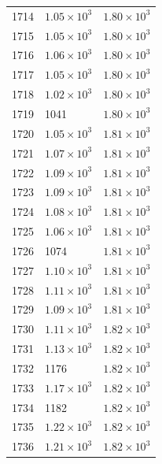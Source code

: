\begin{table}[H]
\begin{tabular}{lll}
1714 & $\displaystyle 1.05 \times 10^{3}$ & $\displaystyle 1.80 \times 10^{3}$ \\
1715 & $\displaystyle 1.05 \times 10^{3}$ & $\displaystyle 1.80 \times 10^{3}$ \\
1716 & $\displaystyle 1.06 \times 10^{3}$ & $\displaystyle 1.80 \times 10^{3}$ \\
1717 & $\displaystyle 1.05 \times 10^{3}$ & $\displaystyle 1.80 \times 10^{3}$ \\
1718 & $\displaystyle 1.02 \times 10^{3}$ & $\displaystyle 1.80 \times 10^{3}$ \\
1719 & 1041 & $\displaystyle 1.80 \times 10^{3}$ \\
1720 & $\displaystyle 1.05 \times 10^{3}$ & $\displaystyle 1.81 \times 10^{3}$ \\
1721 & $\displaystyle 1.07 \times 10^{3}$ & $\displaystyle 1.81 \times 10^{3}$ \\
1722 & $\displaystyle 1.09 \times 10^{3}$ & $\displaystyle 1.81 \times 10^{3}$ \\
1723 & $\displaystyle 1.09 \times 10^{3}$ & $\displaystyle 1.81 \times 10^{3}$ \\
1724 & $\displaystyle 1.08 \times 10^{3}$ & $\displaystyle 1.81 \times 10^{3}$ \\
1725 & $\displaystyle 1.06 \times 10^{3}$ & $\displaystyle 1.81 \times 10^{3}$ \\
1726 & 1074 & $\displaystyle 1.81 \times 10^{3}$ \\
1727 & $\displaystyle 1.10 \times 10^{3}$ & $\displaystyle 1.81 \times 10^{3}$ \\
1728 & $\displaystyle 1.11 \times 10^{3}$ & $\displaystyle 1.81 \times 10^{3}$ \\
1729 & $\displaystyle 1.09 \times 10^{3}$ & $\displaystyle 1.81 \times 10^{3}$ \\
1730 & $\displaystyle 1.11 \times 10^{3}$ & $\displaystyle 1.82 \times 10^{3}$ \\
1731 & $\displaystyle 1.13 \times 10^{3}$ & $\displaystyle 1.82 \times 10^{3}$ \\
1732 & 1176 & $\displaystyle 1.82 \times 10^{3}$ \\
1733 & $\displaystyle 1.17 \times 10^{3}$ & $\displaystyle 1.82 \times 10^{3}$ \\
1734 & 1182 & $\displaystyle 1.82 \times 10^{3}$ \\
1735 & $\displaystyle 1.22 \times 10^{3}$ & $\displaystyle 1.82 \times 10^{3}$ \\
1736 & $\displaystyle 1.21 \times 10^{3}$ & $\displaystyle 1.82 \times 10^{3}$ \\

\end{tabular}
\end{table}
